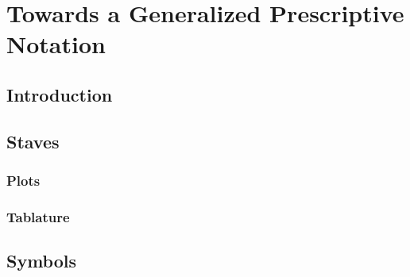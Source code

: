 \chapter{Towards a Generalized Prescriptive Notation}
\section{Introduction}
\section{Staves}
\subsection{Plots}
\subsection{Tablature}
\section{Symbols}

